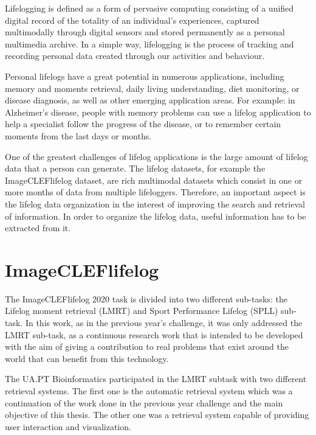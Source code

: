 Lifelogging is defined as a form of pervasive computing consisting of a unified digital record of the totality of an individual’s experiences, captured multimodally through digital sensors and stored permanently as a personal multimedia archive. In a simple way, lifelogging is the process of tracking and recording personal data created through our activities and behaviour.

Personal lifelogs have a great potential in numerous applications, including memory and moments retrieval, daily living understanding, diet monitoring, or disease diagnosis, as well as other emerging application areas. For example: in Alzheimer’s disease, people with memory problems can use a lifelog application to help a specialist follow the progress of the disease, or to remember certain moments from the last days or months.

One of the greatest challenges of lifelog applications is the large amount of lifelog data that a person can generate. The lifelog datasets, for example the ImageCLEFlifelog dataset, are rich multimodal datasets which consist in one or more months of data from multiple lifeloggers. Therefore, an important aspect is the lifelog data organization in the interest of improving the search and retrieval of information. In order to organize the lifelog data, useful information has to be extracted from it. \cite{Ribeiro2019} \cite{Ribeiro2020}

\newpage
\section{ImageCLEFlifelog}

\label{sec:imagecleflifelog}


The ImageCLEFlifelog 2020 task is divided into two different sub-tasks: the Lifelog moment retrieval (LMRT) and Sport Performance Lifelog (SPLL) sub-task. In this work, as in the previous year’s challenge, it was only addressed the LMRT sub-task, as a continuous research work that is intended to be developed with the aim of giving a contribution to real problems that exist around the world that can benefit from this technology.
    
The UA.PT Bioinformatics participated in the LMRT subtask with two different retrieval systems. The first one is the automatic retrieval system which was a continuation of the work done in the previous year challenge \cite{Ribeiro2019} and the main objective of this thesis. The other one was a retrieval system capable of providing user interaction and visualization. 

